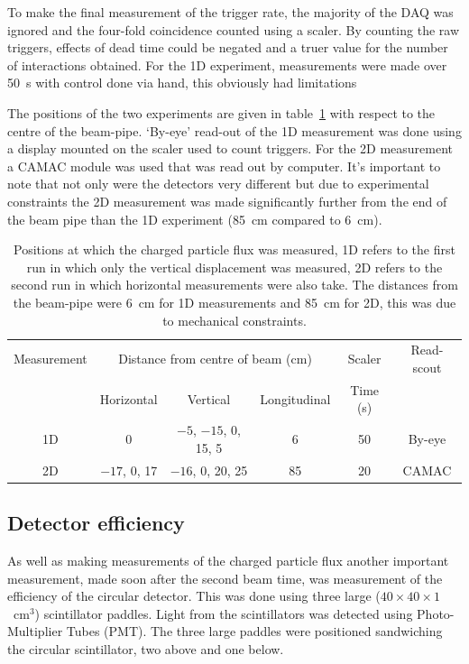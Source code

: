 To make the final measurement of the trigger rate, the majority of the DAQ was ignored and the four-fold coincidence counted using a scaler. By counting the raw triggers, effects of dead time could be negated and a truer value for the number of interactions obtained. For the 1D experiment, measurements were made over 50~s with control done via hand, this obviously had limitations 

The positions of the two experiments are given in table~\ref{tab:flux_setup} with respect to the centre of the beam-pipe. `By-eye' read-out of the 1D measurement was done using a display mounted on the scaler used to count triggers. For the 2D measurement a CAMAC module was used that was read out by computer. It's important to note that not only were the detectors very different but due to experimental constraints the 2D measurement was made significantly further from the end of the beam pipe than the 1D experiment (85~cm compared to 6~cm).
\begin{table}
  \begin{center}
    \begin{tabular}{c|c|c|c|c|c}
      Measurement  &  \multicolumn{3}{c|}{Distance from centre of beam (cm)}         &  Scaler    &  Read-scout \\
      &    Horizontal    &       Vertical              &  Longitudinal  &  Time (s)  &          \\
      \hline            
      1D           &  0               &  \(-5\), \(-15\), 0, 15, 5  &       6        &  50        & By-eye   \\
      2D           &  \(-17\), 0, 17  &  \(-16\), 0, 20, 25         &       85       &  20        & CAMAC    \\
    \end{tabular}
  \end{center}
  \caption{Positions at which the charged particle flux was measured, 1D refers to the first run in which only the vertical displacement was measured, 2D refers to the second run in which horizontal measurements were also take. The distances from the beam-pipe were 6~cm for 1D measurements and 85~cm for 2D, this was due to mechanical constraints.}
  \label{tab:flux_setup}
\end{table}

\subsection{Detector efficiency} %
\label{sec:detector_efficiency}
As well as making measurements of the charged particle flux another important measurement, made soon after the second beam time, was measurement of the efficiency of the circular detector. This was done using three large (\( 40\times40\times1 \)~cm\(^3\)) scintillator paddles. Light from the scintillators was detected using Photo-Multiplier Tubes (PMT). The three large paddles were positioned sandwiching the circular scintillator, two above and one below. 

